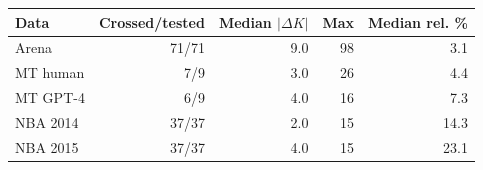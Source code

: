 \begin{tabular}{lrrrr}
\toprule
Data & Crossed/tested & Median $|\Delta K|$ & Max & Median rel. \% \\
\midrule
Arena & 71/71 & 9.0 & 98 & 3.1 \\
MT human & 7/9 & 3.0 & 26 & 4.4 \\
MT GPT-4 & 6/9 & 4.0 & 16 & 7.3 \\
NBA 2014 & 37/37 & 2.0 & 15 & 14.3 \\
NBA 2015 & 37/37 & 4.0 & 15 & 23.1 \\
\bottomrule
\end{tabular}

